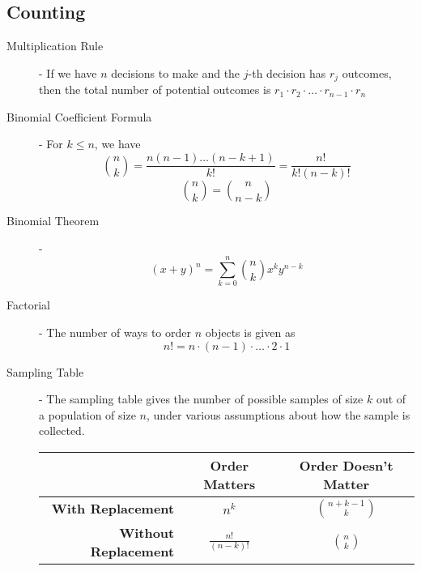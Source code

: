 \documentclass[11pt]{article}
\begin{document}
\begin{notes}
\section*{Counting}
\begin{description}
	\item[Multiplication Rule] - If we have $n$ decisions to make and the $j$-th decision has $r_j$ outcomes, then the total number of potential outcomes is $r_1\cdot r_2\cdot\dots\cdot r_{n-1}\cdot r_n$ 
	
	\begin{minipage}{\linewidth}
            \centering
        \end{minipage}

	\item[Binomial Coefficient Formula] -  For $k\leq n$, we have $$ \binom{n}{k} = \frac{n(n-1)\dots(n-k+1)}{k!} = \frac{n!}{k!(n-k)!} $$ 
	$$\binom{n}{k} = \binom{n}{n-k}$$
	\item[Binomial Theorem] - $$(x+y)^n=\sum_{k=0}^n \binom{n}{k}x^k y^{n-k}$$ 
	\item[Factorial] - The number of ways to order $n$ objects is given as $$n! = n\cdot(n-1)\cdot\dots\cdot2\cdot1$$
	\item[Sampling Table] - 
	The sampling table gives the number of possible samples of size $k$ out of a population of size $n$, under various assumptions about how the sample is collected. 
        \begin{table}[H]
        \begin{center}
              \setlength{\extrarowheight}{7pt}
            \begin{tabular}{r|cc}
                 & \textbf{Order Matters} & \textbf{Order Doesn't Matter} \\ \hline
                \textbf{With Replacement} & $\displaystyle n^k$ & $\displaystyle{\binom{n+k-1}{k}}$ \\
                \textbf{Without Replacement} & $\displaystyle\frac{n!}{(n - k)!}$ & $\displaystyle{n \choose k}$
            \end{tabular}
        \end{center}
        \end{table}

\end{description}
\end{notes}

\newpage
\end{document}
